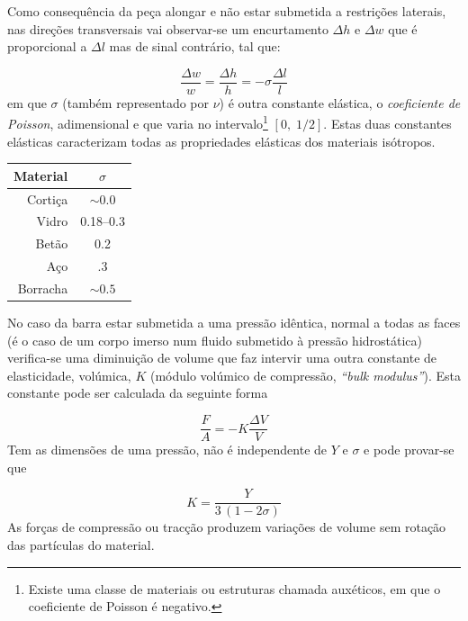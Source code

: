\documentclass[a4paper,12pt]{article}
\begin{document}
Como consequência da peça alongar e não estar submetida a restrições laterais, nas direções transversais vai observar-se um encurtamento $\Delta h$ e $\Delta w$ que é proporcional a $\Delta l$ mas de sinal contrário, tal que:

\begin{equation}
	\label{eq:poisson}
	 \frac{\Delta w}{w}  =   \frac{\Delta h}{h}  = - \sigma  \frac{\Delta l}{l} 
\end{equation}
em que $\sigma$ (também representado por $\nu$) é outra constante elástica, o \emph{coeficiente de Poisson}, adimensional e que varia no intervalo\footnote{Existe uma classe de materiais ou estruturas chamada auxéticos, em que o coeficiente de Poisson é negativo.} $[ 0,\;1/2 ] $.
Estas duas constantes elásticas caracterizam todas as propriedades elásticas dos materiais isótropos.

\begin{center}

\begin{tabular}{|r|c|}
\hline
\textbf{Material} & \textbf{$\sigma$}\\
\hline
Cortiça  & $\sim 0.0$ \\
Vidro & 0.18–0.3 \\
Betão & 0.2\\
Aço  & .3 \\
Borracha & $\sim 0.5$\\
\hline
\end{tabular}
\end{center}


No caso da barra estar submetida a uma pressão idêntica, normal a todas as faces (é o caso de um corpo imerso num fluido submetido à pressão hidrostática) verifica-se uma diminuição de volume que faz intervir uma outra constante de elasticidade, volúmica, $K$ (módulo volúmico de compressão, \emph{“bulk modulus”}). Esta constante pode ser calculada da seguinte forma

\begin{equation}
	\label{eq:bulk}
	 \frac{F}{A}  =  -K \frac{\Delta V}{V} 
\end{equation}
Tem as dimensões de uma pressão, não é independente de $Y$ e $\sigma$ e pode provar-se que 

\begin{equation}
	\label{eq:K}
	 K=\frac{Y}{3\,(1-2\sigma)} 
\end{equation}
As forças de compressão ou tracção produzem variações de volume sem rotação das partículas do material.
\end{document}
